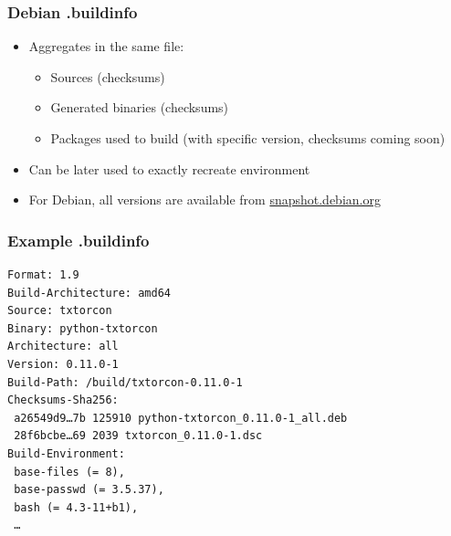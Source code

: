 \documentclass[14pt,aspectratio=169]{beamer}
\begin{document}
\begin{frame}
 \frametitle{Debian .buildinfo}

 \begin{itemize}
  \item Aggregates in the same file:
   \begin{itemize}
    \item Sources (checksums)
    \item Generated binaries (checksums)
    \item Packages used to build (with specific version, checksums coming soon)
   \end{itemize}
  \item Can be later used to exactly recreate environment
  \item For Debian, all versions are available from \url{snapshot.debian.org}
 \end{itemize}
\end{frame}


\begin{frame}[fragile]
 \frametitle{Example .buildinfo}

{\small
\begin{verbatim}
Format: 1.9
Build-Architecture: amd64
Source: txtorcon
Binary: python-txtorcon
Architecture: all
Version: 0.11.0-1
Build-Path: /build/txtorcon-0.11.0-1
Checksums-Sha256:
 a26549d9…7b 125910 python-txtorcon_0.11.0-1_all.deb
 28f6bcbe…69 2039 txtorcon_0.11.0-1.dsc
Build-Environment:
 base-files (= 8),
 base-passwd (= 3.5.37),
 bash (= 4.3-11+b1),
 …
\end{verbatim}
}
\end{frame}
\end{document}
